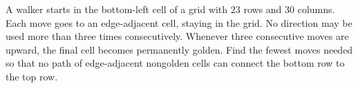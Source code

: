 A walker starts in the bottom-left cell of a grid with $23$ rows and $30$ columns. Each move goes to an edge-adjacent cell, staying in the grid. No direction may be used more than three times consecutively. Whenever three consecutive moves are upward, the final cell becomes permanently golden. Find the fewest moves needed so that no path of edge-adjacent nongolden cells can connect the bottom row to the top row.
